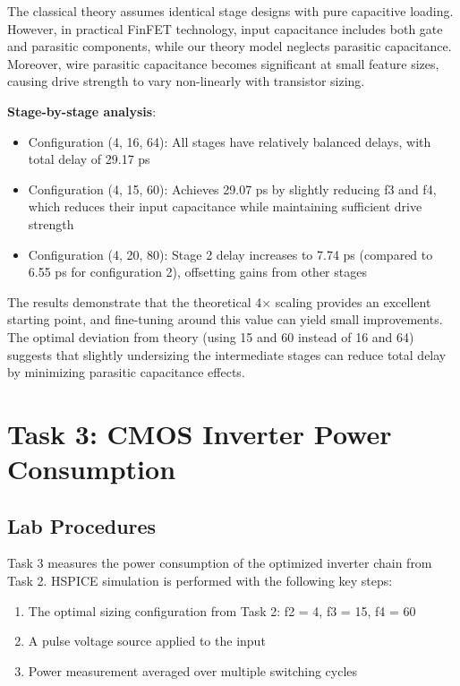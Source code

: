 \documentclass[UTF8,12pt,a4paper]{ctexart}
\begin{document}
The classical theory assumes identical stage designs with pure capacitive loading. However, in practical FinFET technology, input capacitance includes both gate and parasitic components, while our theory model neglects parasitic capacitance. Moreover, wire parasitic capacitance becomes significant at small feature sizes, causing drive strength to vary non-linearly with transistor sizing.

\textbf{Stage-by-stage analysis}: 
\begin{itemize}
    \item[1.] Configuration (4, 16, 64): All stages have relatively balanced delays, with total delay of 29.17 ps
    \item[2.] Configuration (4, 15, 60): Achieves 29.07 ps by slightly reducing f3 and f4, which reduces their input capacitance while maintaining sufficient drive strength
    \item[3.] Configuration (4, 20, 80): Stage 2 delay increases to 7.74 ps (compared to 6.55 ps for configuration 2), offsetting gains from other stages
\end{itemize}

The results demonstrate that the theoretical 4× scaling provides an excellent starting point, and fine-tuning around this value can yield small improvements. The optimal deviation from theory (using 15 and 60 instead of 16 and 64) suggests that slightly undersizing the intermediate stages can reduce total delay by minimizing parasitic capacitance effects.

\newpage
\section{Task 3: CMOS Inverter Power Consumption}

\subsection{Lab Procedures}

Task 3 measures the power consumption of the optimized inverter chain from Task 2. HSPICE simulation is performed with the following key steps:

\begin{enumerate}
    \item[1. ] The optimal sizing configuration from Task 2: f2 = 4, f3 = 15, f4 = 60
    \item[2. ] A pulse voltage source applied to the input
    \item[3. ] Power measurement averaged over multiple switching cycles
\end{enumerate}
\end{document}
